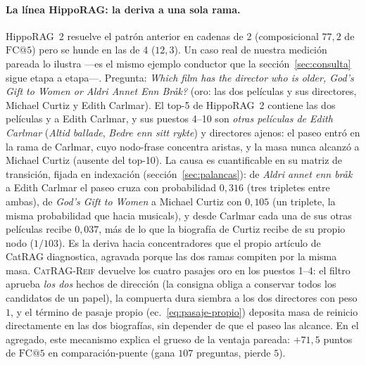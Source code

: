 \documentclass[11pt,a4paper]{article}
\newcommand{\sys}{\textsc{CatRAG-Reif}}          %
\newcommand{\hippo}{HippoRAG~2}
\begin{document}
\paragraph{La línea HippoRAG: la deriva a una sola rama.}
\hippo{} resuelve el patrón anterior en cadenas de 2 (composicional
$77{,}2$ de $\mathrm{FC@}5$) pero se hunde en las de 4 ($12{,}3$). Un caso
real de nuestra medición pareada lo ilustra ---es el mismo ejemplo
conductor que la sección~\ref{sec:consulta} sigue etapa a etapa---.
Pregunta:
\guillemotleft{}\emph{Which film has the director who is older, God's Gift to Women or
Aldri Annet Enn Bråk?}\guillemotright{} (oro: las dos películas y sus directores, Michael
Curtiz y Edith Carlmar). El top-5 de \hippo{} contiene las dos películas y
a Edith Carlmar, y sus puestos 4--10 son \emph{otras películas de Edith
Carlmar} (\emph{Altid ballade}, \emph{Bedre enn sitt rykte}) y directores
ajenos: el paseo entró en la rama de Carlmar, cuyo nodo-frase concentra
aristas, y la masa nunca alcanzó a Michael Curtiz (ausente del top-10).
La causa es cuantificable en su matriz de transición, fijada en
indexación (sección~\ref{sec:palancas}): de \emph{Aldri annet enn bråk} a
Edith Carlmar el paseo cruza con probabilidad $0{,}316$ (tres tripletes
entre ambas), de \emph{God's Gift to Women} a Michael Curtiz con
$0{,}105$ (un triplete, la misma probabilidad que hacia
\guillemotleft{}musicals\guillemotright{}), y desde Carlmar cada una de sus otras películas
recibe $0{,}037$, más de lo que la biografía de Curtiz recibe de su propio
nodo ($1/103$). Es la deriva hacia concentradores que el propio artículo
de CatRAG diagnostica, agravada porque las dos ramas compiten por la
misma masa.
\sys{} devuelve los cuatro pasajes oro en los puestos 1--4: el filtro
aprueba \emph{los dos} hechos de dirección (la consigna obliga a conservar
todos los candidatos de un papel), la compuerta dura siembra a los dos
directores con peso $1$, y el término de pasaje propio
(ec.~\ref{eq:pasaje-propio}) deposita masa de reinicio directamente en las
dos biografías, sin depender de que el paseo las alcance. En el agregado,
este mecanismo explica el grueso de la ventaja pareada: $+71{,}5$ puntos
de $\mathrm{FC@}5$ en comparación-puente (gana $107$ preguntas, pierde
$5$).
\end{document}
